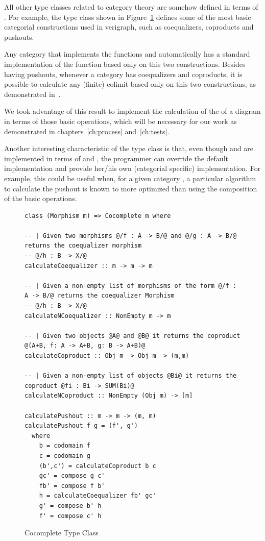 All other type classes related to category theory are somehow defined in terms of . For example, the  type class shown in Figure~\ref{fig:verigraph:cocomplete-type-class} defines some of the most basic categorial constructions used in verigraph, such as coequalizers, coproducts and pushouts.

Any category that implements the functions  and  automatically has a standard implementation of the  function based only on this two constructions. Besides having pushouts, whenever a category has coequalizers and coproducts, it is possible to calculate any (finite) colimit based only on this two constructions, as demonstrated in~\cite{Pierce1991}.

We took advantage of this result to implement the calculation of the  of a diagram in terms of those basic operations, which will be necessary for our work as demonstrated in chapters~\ref{ch:process} and~\ref{ch:tests}.

Another interesting characteristic of the  type class is that, even though  and  are implemented in terms of  and , the programmer can override the default implementation and provide her/his own (categorial specific) implementation. For example, this could be useful when, for a given category , a particular algorithm to calculate the pushout is known to more optimized than using the composition of the basic operations.

\begin{figure}[!ht]
  \begin{verbatim}
class (Morphism m) => Cocomplete m where

-- | Given two morphisms @/f : A -> B/@ and @/g : A -> B/@ returns the coequalizer morphism
-- @/h : B -> X/@
calculateCoequalizer :: m -> m -> m

-- | Given a non-empty list of morphisms of the form @/f : A -> B/@ returns the coequalizer Morphism
-- @/h : B -> X/@
calculateNCoequalizer :: NonEmpty m -> m

-- | Given two objects @A@ and @B@ it returns the coproduct @(A+B, f: A -> A+B, g: B -> A+B)@
calculateCoproduct :: Obj m -> Obj m -> (m,m)

-- | Given a non-empty list of objects @Bi@ it returns the coproduct @fi : Bi -> SUM(Bi)@
calculateNCoproduct :: NonEmpty (Obj m) -> [m]

calculatePushout :: m -> m -> (m, m)
calculatePushout f g = (f', g')
  where
    b = codomain f
    c = codomain g
    (b',c') = calculateCoproduct b c
    gc' = compose g c'
    fb' = compose f b'
    h = calculateCoequalizer fb' gc'
    g' = compose b' h
    f' = compose c' h
\end{verbatim}
\caption{Cocomplete Type Class}\label{fig:verigraph:cocomplete-type-class}
\end{figure}

